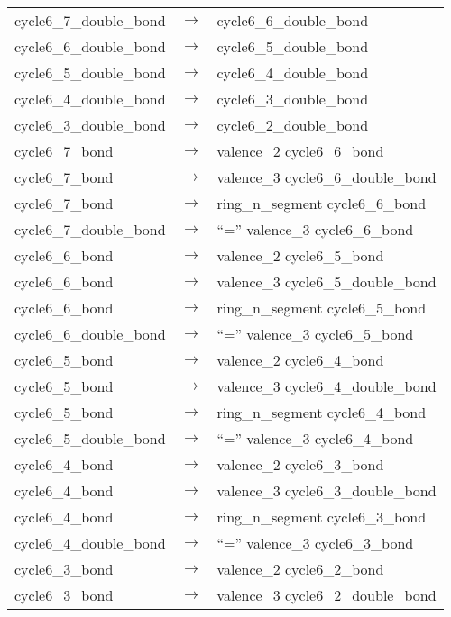 \documentclass[../Document.tex]{subfiles}
\begin{document}
\begin{longtable}{m{} p{} p{}}
    cycle6\_7\_double\_bond & $\rightarrow$ & cycle6\_6\_double\_bond \\
    cycle6\_6\_double\_bond & $\rightarrow$ & cycle6\_5\_double\_bond \\
    cycle6\_5\_double\_bond & $\rightarrow$ & cycle6\_4\_double\_bond \\
    cycle6\_4\_double\_bond & $\rightarrow$ & cycle6\_3\_double\_bond \\
    cycle6\_3\_double\_bond & $\rightarrow$ & cycle6\_2\_double\_bond \\
    cycle6\_7\_bond & $\rightarrow$ & valence\_2 cycle6\_6\_bond \\
    cycle6\_7\_bond & $\rightarrow$ & valence\_3 cycle6\_6\_double\_bond \\
    cycle6\_7\_bond & $\rightarrow$ & ring\_n\_segment cycle6\_6\_bond \\
    cycle6\_7\_double\_bond & $\rightarrow$ & ``='' valence\_3 cycle6\_6\_bond \\
    cycle6\_6\_bond & $\rightarrow$ & valence\_2 cycle6\_5\_bond \\
    cycle6\_6\_bond & $\rightarrow$ & valence\_3 cycle6\_5\_double\_bond \\
    cycle6\_6\_bond & $\rightarrow$ & ring\_n\_segment cycle6\_5\_bond \\
    cycle6\_6\_double\_bond & $\rightarrow$ & ``='' valence\_3 cycle6\_5\_bond \\
    cycle6\_5\_bond & $\rightarrow$ & valence\_2 cycle6\_4\_bond \\
    cycle6\_5\_bond & $\rightarrow$ & valence\_3 cycle6\_4\_double\_bond \\
    cycle6\_5\_bond & $\rightarrow$ & ring\_n\_segment cycle6\_4\_bond \\
    cycle6\_5\_double\_bond & $\rightarrow$ & ``='' valence\_3 cycle6\_4\_bond \\
    cycle6\_4\_bond & $\rightarrow$ & valence\_2 cycle6\_3\_bond \\
    cycle6\_4\_bond & $\rightarrow$ & valence\_3 cycle6\_3\_double\_bond \\
    cycle6\_4\_bond & $\rightarrow$ & ring\_n\_segment cycle6\_3\_bond \\
    cycle6\_4\_double\_bond & $\rightarrow$ & ``='' valence\_3 cycle6\_3\_bond \\
    cycle6\_3\_bond & $\rightarrow$ & valence\_2 cycle6\_2\_bond \\
    cycle6\_3\_bond & $\rightarrow$ & valence\_3 cycle6\_2\_double\_bond \\

\end{longtable}
\end{document}
